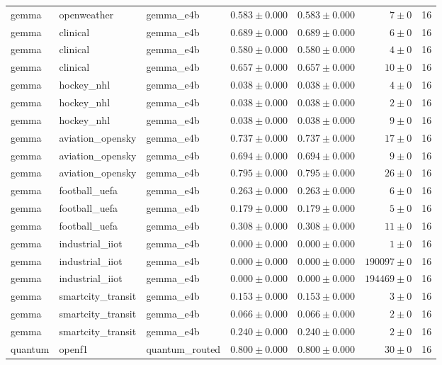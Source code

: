 \begin{table}[htbp]
\begin{tabular}{l l l r r r r}
gemma & openweather & gemma\_e4b & $0.583\pm0.000$ & $0.583\pm0.000$ & $7\pm0$ & 16 \\
gemma & clinical & gemma\_e4b & $0.689\pm0.000$ & $0.689\pm0.000$ & $6\pm0$ & 16 \\
gemma & clinical & gemma\_e4b & $0.580\pm0.000$ & $0.580\pm0.000$ & $4\pm0$ & 16 \\
gemma & clinical & gemma\_e4b & $0.657\pm0.000$ & $0.657\pm0.000$ & $10\pm0$ & 16 \\
gemma & hockey\_nhl & gemma\_e4b & $0.038\pm0.000$ & $0.038\pm0.000$ & $4\pm0$ & 16 \\
gemma & hockey\_nhl & gemma\_e4b & $0.038\pm0.000$ & $0.038\pm0.000$ & $2\pm0$ & 16 \\
gemma & hockey\_nhl & gemma\_e4b & $0.038\pm0.000$ & $0.038\pm0.000$ & $9\pm0$ & 16 \\
gemma & aviation\_opensky & gemma\_e4b & $0.737\pm0.000$ & $0.737\pm0.000$ & $17\pm0$ & 16 \\
gemma & aviation\_opensky & gemma\_e4b & $0.694\pm0.000$ & $0.694\pm0.000$ & $9\pm0$ & 16 \\
gemma & aviation\_opensky & gemma\_e4b & $0.795\pm0.000$ & $0.795\pm0.000$ & $26\pm0$ & 16 \\
gemma & football\_uefa & gemma\_e4b & $0.263\pm0.000$ & $0.263\pm0.000$ & $6\pm0$ & 16 \\
gemma & football\_uefa & gemma\_e4b & $0.179\pm0.000$ & $0.179\pm0.000$ & $5\pm0$ & 16 \\
gemma & football\_uefa & gemma\_e4b & $0.308\pm0.000$ & $0.308\pm0.000$ & $11\pm0$ & 16 \\
gemma & industrial\_iiot & gemma\_e4b & $0.000\pm0.000$ & $0.000\pm0.000$ & $1\pm0$ & 16 \\
gemma & industrial\_iiot & gemma\_e4b & $0.000\pm0.000$ & $0.000\pm0.000$ & $190097\pm0$ & 16 \\
gemma & industrial\_iiot & gemma\_e4b & $0.000\pm0.000$ & $0.000\pm0.000$ & $194469\pm0$ & 16 \\
gemma & smartcity\_transit & gemma\_e4b & $0.153\pm0.000$ & $0.153\pm0.000$ & $3\pm0$ & 16 \\
gemma & smartcity\_transit & gemma\_e4b & $0.066\pm0.000$ & $0.066\pm0.000$ & $2\pm0$ & 16 \\
gemma & smartcity\_transit & gemma\_e4b & $0.240\pm0.000$ & $0.240\pm0.000$ & $2\pm0$ & 16 \\
quantum & openf1 & quantum\_routed & $0.800\pm0.000$ & $0.800\pm0.000$ & $30\pm0$ & 16 \\

\end{tabular}
\end{table}
